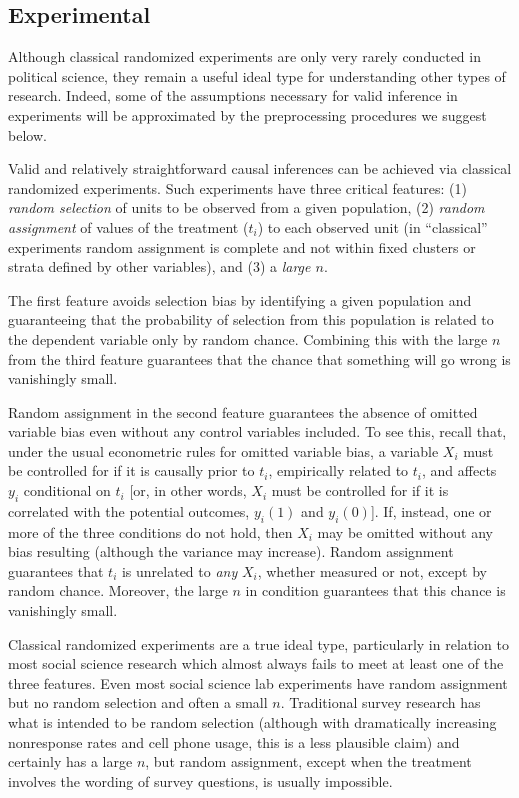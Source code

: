 \documentclass[11pt,titlepage]{article}
\begin{document}
\subsection{Experimental}

Although classical randomized experiments are only very rarely
conducted in political science, they remain a useful ideal type for
understanding other types of research.  Indeed, some of the
assumptions necessary for valid inference in experiments will be
approximated by the preprocessing procedures we suggest below.

Valid and relatively straightforward causal inferences can be achieved
via classical randomized experiments.  Such experiments have three
critical features: (1) \emph{random selection} of units to be observed
from a given population, (2) \emph{random assignment} of values of the
treatment ($t_i$) to each observed unit (in ``classical'' experiments
random assignment is complete and not within fixed clusters or strata
defined by other variables), and (3) a \emph{large $n$}.

The first feature avoids selection bias by identifying a given
population and guaranteeing that the probability of selection from
this population is related to the dependent variable only by random
chance.  Combining this with the large $n$ from the third feature
guarantees that the chance that something will go wrong is vanishingly
small.

Random assignment in the second feature guarantees the absence of
omitted variable bias even without any control variables included.  To
see this, recall that, under the usual econometric rules for omitted
variable bias, a variable $X_i$ must be controlled for if it is
causally prior to $t_i$, empirically related to $t_i$, and affects
$y_i$ conditional on $t_i$ [or, in other words, $X_i$ must be
controlled for if it is correlated with the potential outcomes,
$y_i(1)$ and $y_i(0)$].  If, instead, one or more of the three
conditions do not hold, then $X_i$ may be omitted without any bias
resulting (although the variance may increase).  Random assignment
guarantees that $t_i$ is unrelated to \emph{any} $X_i$, whether
measured or not, except by random chance.  Moreover, the large $n$ in
condition guarantees that this chance is vanishingly small.

Classical randomized experiments are a true ideal type, particularly
in relation to most social science research which almost always fails
to meet at least one of the three features.  Even most social science
lab experiments have random assignment but no random selection and
often a small $n$.  Traditional survey research has what is intended
to be random selection (although with dramatically increasing
nonresponse rates and cell phone usage, this is a less plausible
claim) and certainly has a large $n$, but random assignment, except
when the treatment involves the wording of survey questions, is
usually impossible.
\end{document}
